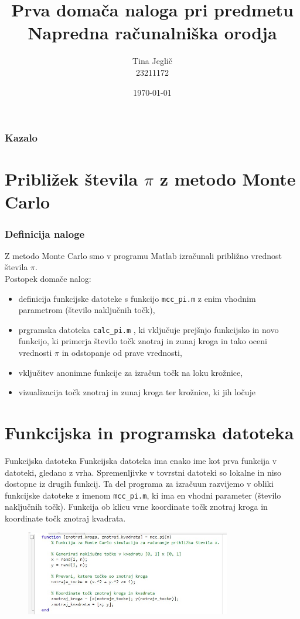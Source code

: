 \documentclass{beamer}
\title{Prva domača naloga pri predmetu\\ Napredna računalniška orodja}
\author{Tina Jeglič\\23211172}
\date{\today}
\begin{document}
\titlepage

\begin{frame}
\frametitle{Kazalo}
\tableofcontents
\end{frame}

\section{Približek števila $\pi$ z metodo Monte Carlo}
\begin{frame}
  \frametitle{Definicija naloge}
  Z metodo Monte Carlo smo v programu Matlab izračunali približno vrednost števila $\pi$.\\ Postopek domače nalog:
     \begin{itemize}
        \item definicija funkcijske datoteke s funkcijo \texttt{mcc\_pi.m} z enim vhodnim parametrom (število naključnih točk),
        \item prgramska datoteka \texttt{calc\_pi.m} , ki vključuje prejšnjo funkcijsko in novo funkcijo, ki primerja število točk znotraj in zunaj kroga in tako oceni vrednosti $\pi$ in odstopanje od prave vrednosti,
        \item vključitev anonimne funkcije za izračun točk na loku krožnice,
        \item vizualizacija točk znotraj in zunaj kroga ter krožnice, ki jih ločuje
  \end{itemize}
\end{frame}

\section{Funkcijska in programska datoteka}
\begin{frame}{Funkcijska datoteka}
Funkcijska datoteka ima enako ime kot prva funkcija v datoteki, gledano z vrha.
Spremenljivke v tovrstni datoteki so lokalne in niso dostopne iz drugih funkcij. Ta del programa za izračuun razvijemo v obliki funkcijske datoteke z imenom \texttt{mcc\_pi.m}, ki ima en vhodni parameter (število naključnih točk). Funkcija ob klicu vrne koordinate točk znotraj kroga in koordinate točk znotraj kvadrata.
 \begin{figure}
    \centering
    \includegraphics[width=0.8\textwidth]{mcc_pi.m.jpg}
  \end{figure}
\end{frame}
\end{document}
